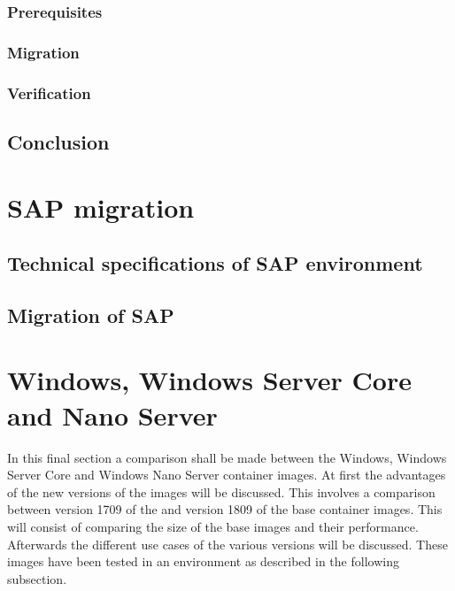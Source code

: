 \subsubsection{Prerequisites}
\subsubsection{Migration}
\subsubsection{Verification}
\subsection{Conclusion}

\clearpage

\section{SAP migration}
\subsection{Technical specifications of SAP environment}
\subsection{Migration of SAP}

\clearpage

\section{Windows, Windows Server Core and Nano Server}
In this final section a comparison shall be made between the Windows, Windows Server Core and Windows Nano Server container images. At first the advantages of the new versions of the images will be discussed. This involves a comparison between version 1709 of the and version 1809 of the base container images. This will consist of comparing the size of the base images and their performance. Afterwards the different use cases of the various versions will be discussed. These images have been tested in an environment as described in the following subsection.

